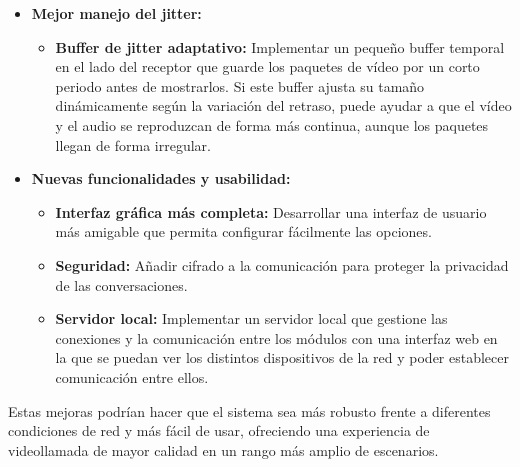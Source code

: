 \begin{itemize}
\item \textbf{Mejor manejo del jitter:}
\begin{itemize}
    \item \textbf{Buffer de jitter adaptativo:} Implementar un pequeño buffer temporal en el lado del receptor que guarde los paquetes de vídeo por un corto periodo antes de mostrarlos. Si este buffer ajusta su tamaño dinámicamente según la variación del retraso, puede ayudar a que el vídeo y el audio se reproduzcan de forma más continua, aunque los paquetes llegan de forma irregular.
\end{itemize}

\item \textbf{Nuevas funcionalidades y usabilidad:}
\begin{itemize}
    \item \textbf{Interfaz gráfica más completa:} Desarrollar una interfaz de usuario más amigable que permita configurar fácilmente las opciones.
    \item \textbf{Seguridad:} Añadir cifrado a la comunicación para proteger la privacidad de las conversaciones.
    \item \textbf{Servidor local:} Implementar un servidor local que gestione las conexiones y la comunicación entre los módulos con una interfaz web en la que se puedan ver los distintos dispositivos de la red y poder establecer comunicación entre ellos.
\end{itemize}
\end{itemize}

Estas mejoras podrían hacer que el sistema sea más robusto frente a diferentes condiciones de red y más fácil de usar, ofreciendo una experiencia de videollamada de mayor calidad en un rango más amplio de escenarios.